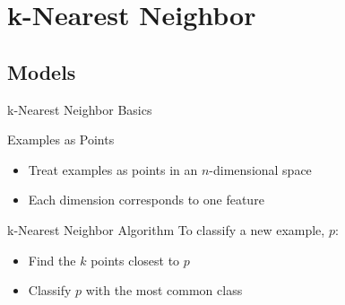 \documentclass[12pt]{beamer}
\begin{document}
\section{k-Nearest Neighbor}
\subsection{Models}
\begin{frame}{k-Nearest Neighbor Basics}
	\begin{block}{Examples as Points}
		\begin{itemize}
			\item Treat examples as points in an $n$-dimensional space
			\item Each dimension corresponds to one feature
		\end{itemize}
	\end{block}
	\pause
	\begin{block}{k-Nearest Neighbor Algorithm}
		To classify a new example, $p$:
		\begin{itemize}
			\item Find the $k$ points closest to $p$
			\item Classify $p$ with the most common class
		\end{itemize}
	\end{block}
\end{frame}
\end{document}
